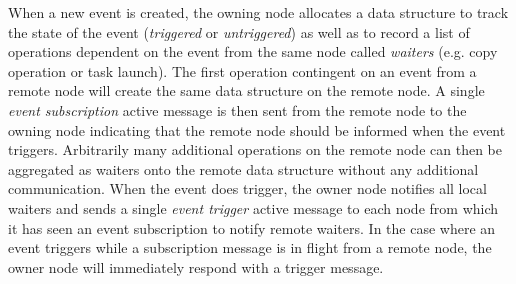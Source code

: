 When a new event is created, the owning node allocates a data structure to track the state of
the event ({\em triggered} or {\em untriggered}) as well as to record a list of operations dependent on the
event from the same node called {\em waiters} (e.g. copy operation or task launch).  The first operation contingent on an event
from a remote node will create the same data structure on the remote node.  A single
{\em event subscription} active message is then sent from the remote node to the owning node indicating
that the remote node should be informed when the event triggers.  Arbitrarily many additional operations on
the remote node can then be aggregated as waiters onto the remote data structure without any additional communication.
When the event does trigger, the owner node notifies all local waiters and
sends a single {\em event trigger} active message to each node from which it has seen an event subscription
to notify remote waiters.
In the case where an event triggers while a subscription message is in flight from a remote node, the owner node will
immediately respond with a trigger message.

